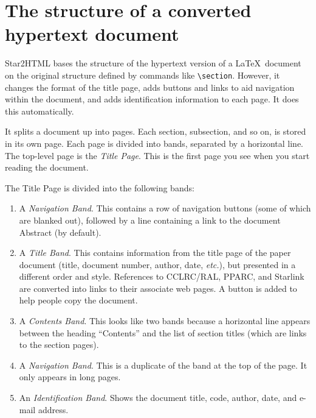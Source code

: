 \documentclass[twoside,11pt]{article}
\newcommand{\xlabel}[1]{}
\renewcommand{\_}{\texttt{\symbol{95}}}
\begin{document}
\newpage

\section{\xlabel{the_structure_of_a_converted_hypertext_document}The structure of a converted hypertext document}

Star2HTML bases the structure of the hypertext version of a \LaTeX\ document
on the original structure defined by commands like \verb+\section+.
However, it changes the format of the title page, adds buttons and links
to aid navigation within the document, and adds identification information
to each page.
It does this automatically.

It splits a document up into pages.
Each section, subsection, and so on, is stored in its own page.
Each page is divided into bands, separated by a horizontal line.
The top-level page is the \emph{Title Page}.
This is the first page you see when you start reading the document.

The Title Page is divided into the following bands:

\begin{enumerate}
\item A \emph{Navigation Band}.
 This contains a row of navigation buttons (some of which are blanked out),
 followed by a line containing a link to the document Abstract (by default).
\item A \emph{Title Band}.
 This contains information from the title page of the paper document (title,
 document number, author, date, \textit{etc.}), but presented in a different
 order and style.
 References to CCLRC/RAL, PPARC, and Starlink are converted into links
 to their associate web pages.
 A button is added to help people copy the document.
\item A \emph{Contents Band}.
 This looks like two bands because a horizontal line appears between the heading
 ``Contents'' and the list of section titles (which are links to the
 section pages).
\item A \emph{Navigation Band}.
 This is a duplicate of the band at the top of the page.
 It only appears in long pages.
\item An \emph{Identification Band}.
 Shows the document title, code, author, date, and e-mail address.
\end{enumerate}
\end{document}
